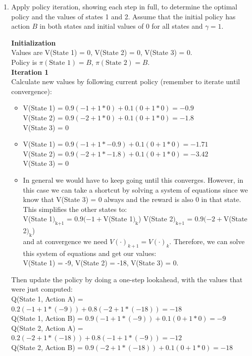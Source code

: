 \documentclass[11pt]{article}
\newif\ifsol
\begin{document}
\begin{enumerate}
\begin{enumerate}[label=\alph*)]
  \item Apply policy iteration, showing each step in full, to determine the optimal policy and the values of states 1 and 2. Assume that the initial policy has action $B$ in both states and initial values of $0$ for all states and $\gamma=1$. \\

  \ifsol
    {\color{blue}
        \textbf{Initialization} \\
        Values are V(State 1) = 0, V(State 2) = 0, V(State 3) = 0. \\
        Policy is $\pi(\text{State 1}) = B$, $\pi(\text{State 2}) = B$. \\
    
        \textbf{Iteration 1} \\
        Calculate new values by following current policy (remember to iterate until convergence):
        \begin{itemize}
            \item V(State 1) = $0.9 (-1 + 1 * 0) + 0.1 (0 + 1 * 0) = -0.9$  \\
                  V(State 2) = $0.9 (-2 + 1 * 0) + 0.1 (0 + 1 * 0) = -1.8$  \\
                  V(State 3) = $0$
            \item V(State 1) = $0.9 (-1 + 1 * -0.9) + 0.1 (0 + 1 * 0) = -1.71$  \\
                  V(State 2) = $0.9 (-2 + 1 * -1.8) + 0.1 (0 + 1 * 0) = -3.42$  \\
                  V(State 3) = $0$
            \item In general we would have to keep going until this converges. However, in this case we can take a shortcut by solving a system of equations since we know that V(State 3) = $0$ always and the reward is also $0$ in that state. This simplifies the other states to:\\ 
            V(State 1$)_\text{k+1}$ = $0.9 (-1 + $V(State 1$)_\text{k}$) \;\;\;\; 
            V(State 2$)_\text{k+1}$ = $0.9 (-2 + $V(State 2$)_\text{k}$)\\
            and at convergence we need $V(\cdot)_{k+1} = V(\cdot)_{k}$. Therefore, we can solve this system of equations and get our values: \\
            
            V(State 1) = -9, V(State 2) = -18, V(State 3) = 0.
        \end{itemize}
        
        Then update the policy by doing a one-step lookahead, with the values that were just computed: \\
        Q(State 1, Action A) = $0.2 (-1 + 1 * (-9)) + 0.8 (-2 + 1 * (-18)) = -18$ \\
        Q(State 1, Action B) = $0.9 (-1 + 1 * (-9)) + 0.1 (0 + 1 * 0) = -9$  \\
        Q(State 2, Action A) = $0.2 (-2 + 1 * (-18)) + 0.8 (-1 + 1 * (-9)) = -12$  \\
        Q(State 2, Action B) = $0.9 (-2 + 1 * (-18)) + 0.1 (0 + 1 * 0) = -18$  \\
        
}
\end{enumerate}
\end{enumerate}
\end{document}

